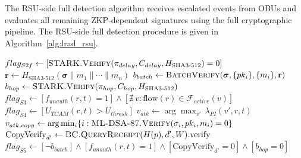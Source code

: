 \documentclass[12pt, a4paper]{report}
\begin{document}
The \ac{RSU}-side full detection algorithm receives escalated
events from \ac{OBU}s and evaluates all remaining
\ac{ZKP}-dependent signatures using the full cryptographic
pipeline. The \ac{RSU}-side full detection procedure is given
in Algorithm~\ref{alg:lrad_rsu}.
\begin{algorithm}[H]
\caption{\ac{RSU} Detection --- Signal Computation (\texttt{LRAD-RSU-Detect})}
\begin{algorithmic}[1]
\small
{}
  \State $flag_{S2f} \gets
         [\textsc{STARK.Verify}(\pi_{delay},
         C_{delay}, H_{\text{SHA3-512}}) = 0]$
         \hfill{}
  \State $\mathbf{r} \gets
         H_{\text{SHA3-512}}(\boldsymbol{\sigma}
         \| m_1 \| \cdots \| m_n)$
         \hfill{}
  \State $b_{batch} \gets
         \textsc{BatchVerify}(\boldsymbol{\sigma},
         \{pk_i\}, \{m_i\}, \mathbf{r})$
         \hfill{}
  \State $b_{hop} \gets
         \textsc{STARK.Verify}(\pi_{hop},
         C_{hop}, H_{\text{SHA3-512}})$
         \hfill{}
  \State $flag_{S3} \gets
         [f_{unauth}(r,t){=}1]
         \land[\nexists\,v{:}\text{flow}(r)
         {\in}\mathcal{F}_{active}(v)]$
         \hfill{}
  \State $flag_{S4} \gets
         [U_{TCAM}(r,t){>}U_{thresh}]$
         \hfill{}
  \State $v_{atk} \gets
         \arg\max_{v'}\,\lambda_{PI}(v',r,t)$
         \hfill{}
    \State $v_{atk,copy} \gets
           \arg\min_{i}\{i :
           \textsc{ML-DSA-87.Verify}
           (\sigma_i,pk_i,m_i)=0\}$
           \hfill{}
  \EndIf
  \State $\text{CopyVerify}_{d'} \gets
         \textsc{BC.QueryReceipt}(H(p),d',W).\text{verify}$
         \hfill{}
  \State $flag_{S5} \gets
         [\neg b_{batch}]
         \land[f_{unauth}(r,t){=}1]
         \land[\text{CopyVerify}_{d'}{=}0]
         \land[b_{hop}{=}0]$
         \hfill{}
\end{algorithmic}
\end{algorithm}
\end{document}

